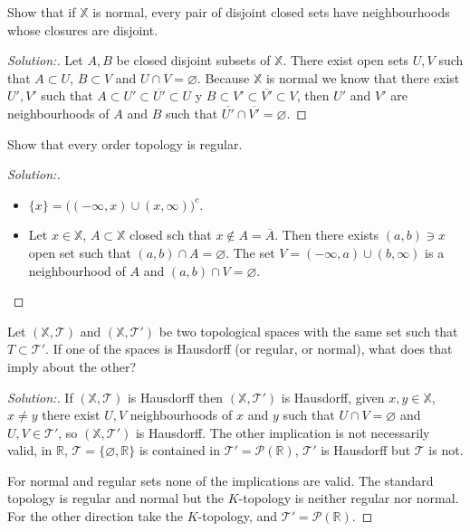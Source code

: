 \documentclass[a4paper,12pt, reqno]{article}
\theoremstyle{definition}
\newenvironment{exerr}[1]{
  \renewcommand\theexeralt{#1}
  \exeralt
}{\endexeralt}
\newenvironment{solution}{\begin{proof}[Solution:]}{\end{proof}}
\newcommand{\R}{\mathbb{R}}
\newcommand{\T}{\mathscr{T}}
\newcommand{\X}{\mathbb{X}}
\newcommand{\Par}{\mathcal{P}}
\begin{document}
\begin{exerr}{2}
  Show that if $\X$ is normal, every pair of disjoint closed sets have neighbourhoods whose closures are disjoint.
\end{exerr}
\begin{solution}
  Let $A,B$ be closed disjoint subsets of $\X$. There exist open sets $U,V$ such that $A\subset U$, $B\subset V$ and $U\cap V = \varnothing$. Because $\X$ is normal we know that there exist $U', V'$ such that $A\subset U'\subset\overline{U'}\subset U$ y $B\subset V'\subset\overline{V'}\subset V$, then $U'$ and $V'$ are neighbourhoods of $A$ and $B$ such that $\overline{U'}\cap\overline{V'} = \varnothing$.
\end{solution}

\begin{exerr}{3}
  Show that every order topology is regular.
\end{exerr}
\begin{solution}\hfill
  \begin{itemize}
    \item $\{ x \}   = \big( (-\infty,x)\cup(x,\infty) \big)^c$.
    \item Let $x\in\X$, $A\subset \X$ closed sch that $x\notin A = \overline{A}$. Then there exists $(a,b)\ni x$ open set such that $(a,b)\cap A = \varnothing$. The set $V = (-\infty,a)\cup(b,\infty)$ is a neighbourhood of $A$ and $(a,b)\cap V = \varnothing$.
  \end{itemize}
\end{solution}

\begin{exerr}{4}
  Let $(\X,\T)$ and $(\X,\T')$ be two topological spaces with the same set such that $T\subset\T'$. If one of the spaces is Hausdorff (or regular, or normal), what does that imply about the other?
\end{exerr}
\begin{solution}
  If $(\X,\T)$ is Hausdorff then $(\X,\T')$ is Hausdorff, given $x,y\in\X$, $x\neq y$ there exist $U,V$ neighbourhoods of $x$ and $y$ such that $U\cap V = \varnothing$ and $U, V\in\T'$, so $(\X,\T')$ is Hausdorff. The other implication is not necessarily valid, in $\R$, $\T = \{ \varnothing,\R \}$ is contained in $\T' = \Par(\R)$, $\T'$ is Hausdorff but $\T$ is not.

  For normal and regular sets none of the implications are valid. The standard topology is regular and normal but the $K$-topology is neither regular nor normal. For the other direction take the $K$-topology, and $\T' = \Par(\R)$.
\end{solution}
\end{document}
